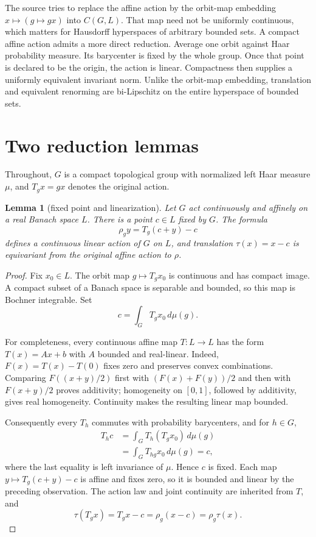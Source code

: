 \documentclass[11pt]{article}
\newtheorem{lemma}[theorem]{Lemma}
\begin{document}
The source tries to replace the affine action by the orbit-map embedding
$x\mapsto(g\mapsto gx)$ into $C(G,L)$.  That map need not be uniformly
continuous, which matters for Hausdorff hyperspaces of arbitrary bounded
sets.  A compact affine action admits a more direct reduction.  Average one
orbit against Haar probability measure.  Its barycenter is fixed by the
whole group.  Once that point is declared to be the origin, the action is
linear.  Compactness then supplies a uniformly equivalent invariant norm.
Unlike the orbit-map embedding, translation and equivalent renorming are
bi-Lipschitz on the entire hyperspace of bounded sets.

\section{Two reduction lemmas}

Throughout, $G$ is a compact topological group with normalized left Haar
measure $\mu$, and $T_gx=gx$ denotes the original action.

\begin{lemma}[fixed point and linearization]\label{lem:linearize}
Let $G$ act continuously and affinely on a real Banach space $L$.  There is a
point $c\in L$ fixed by $G$.  The formula
\[
  \rho_g y=T_g(c+y)-c
\]
defines a continuous linear action of $G$ on $L$, and translation
$\tau(x)=x-c$ is equivariant from the original affine action to $\rho$.
\end{lemma}

\begin{proof}
Fix $x_0\in L$.  The orbit map $g\mapsto T_gx_0$ is continuous and has
compact image.  A compact subset of a Banach space is separable and bounded,
so this map is Bochner integrable.  Set
\[
  c=\int_G T_gx_0\,d\mu(g).
\]

For completeness, every continuous affine map $T:L\to L$ has the form
$T(x)=Ax+b$ with $A$ bounded and real-linear.  Indeed,
$F(x)=T(x)-T(0)$ fixes zero and preserves convex combinations.  Comparing
$F((x+y)/2)$ first with $(F(x)+F(y))/2$ and then with $F(x+y)/2$ proves
additivity; homogeneity on $[0,1]$, followed by additivity, gives real
homogeneity.  Continuity makes the resulting linear map bounded.

Consequently every $T_h$ commutes with probability barycenters, and for
$h\in G$,
\begin{align*}
 T_hc
 &=\int_G T_h(T_gx_0)\,d\mu(g)\\
 &=\int_G T_{hg}x_0\,d\mu(g)=c,
\end{align*}
where the last equality is left invariance of $\mu$.  Hence $c$ is fixed.
Each map $y\mapsto T_g(c+y)-c$ is affine and fixes zero, so it is bounded and
linear by the preceding observation.  The action law and joint continuity
are inherited from $T$, and
\[
  \tau(T_gx)=T_gx-c=\rho_g(x-c)=\rho_g\tau(x).
\]
\end{proof}
\end{document}
